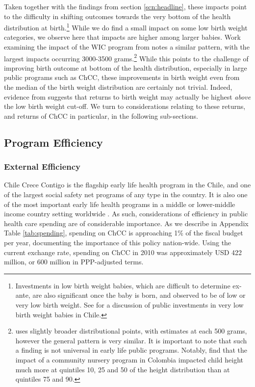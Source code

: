 \documentclass[12pt]{article}
\begin{document}
\begin{spacing}{1.4}
Taken together with the findings from section \ref{scn:headline}, these
impacts point to the difficulty in shifting outcomes towards the very
bottom of the health distribution at birth.\footnote{Investments in low
  birth weight babies, which are difficult to determine ex-ante, are also
  significant once the baby is born, and observed to be of low or very
  low birth weight.  See \citet{Bharadwajetal2013} for a discussion of
  public investments in very low birth weight babies in Chile.}  While we
do find a small impact on some low birth weight categories, we observe
here that impacts are higher among larger babies.  Work examining the
impact of the WIC program from \citet{RossinSlater2013} notes a similar
pattern, with the largest impacts occurring 3000-3500 grams.\footnote{
  \citet{RossinSlater2013} uses slightly broader distributional points,
  with estimates at each 500 grams, however the general pattern is very
  similar. It is important to note that such a finding is not universal
  in early life public programs.  Notably, \citet{Orazioetal2013}
  find that the impact of a community nursery program in Colombia
  impacted child height much more at quintiles 10, 25 and 50
  of the height distribution than at quintiles 75 and 90.}  While
this points to the challenge of improving birth outcome at bottom of the
health distribution, especially in large public programs such as ChCC,
these improvements in birth weight even from the median of the birth weight
distribution are certainly not trivial.  Indeed, evidence from
\citet{Royer2009} suggests that returns to birth weight may actually be
highest \emph{above} the low birth weight cut-off. We turn to considerations
relating to these returns, and returns of ChCC in particular, in the
following sub-sections.


\subsection{Program Efficiency}
\label{scn:efficiency}
\subsubsection{External Efficiency}
Chile Crece Contigo is the flagship early life health program
in the Chile, and one of the largest social safety net programs
of any type in the country.  It is also one of the most
important early life health programs in a middle or lower-middle
income country setting worldwide \citep{Richteretal2017}.  As
such, considerations of efficiency in public health care spending
are of considerable importance.  As we describe in Appendix Table
\ref{tab:spending}, spending on ChCC is approaching 1\% of the
fiscal budget per year, documenting the importance of this policy
nation-wide.  Using the current exchange rate, spending on ChCC
in 2010 was approximately USD 422 million, or 600 million in
PPP-adjusted terms.


\end{spacing}
\end{document}
